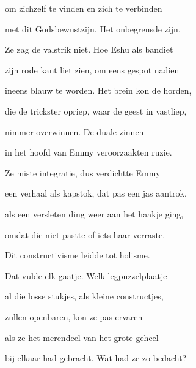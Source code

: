 om zichzelf te vinden
en zich te verbinden

met dit Godsbewustzijn.
Het onbegrensde zijn.

Ze zag de valstrik niet.
Hoe Eshu als bandiet

zijn rode kant liet zien,
om eens gespot nadien

ineens blauw te worden.
Het brein kon de horden,

die de trickster opriep,
waar de geest in vastliep,

nimmer overwinnen.
De duale zinnen

in het hoofd van Emmy
veroorzaakten ruzie.

Ze miste integratie,
dus verdichtte Emmy

een verhaal als kapstok,
dat pas een jas aantrok,

als een versleten ding
weer aan het haakje ging,

omdat die niet pastte
of iets haar verraste.

Dit constructivisme
leidde tot holisme.

Dat vulde elk gaatje.
Welk legpuzzelplaatje

al die losse stukjes,
als kleine constructjes,

zullen openbaren,
kon ze pas ervaren

als ze het merendeel
van het grote geheel

bij elkaar had gebracht.
Wat had ze zo bedacht?
